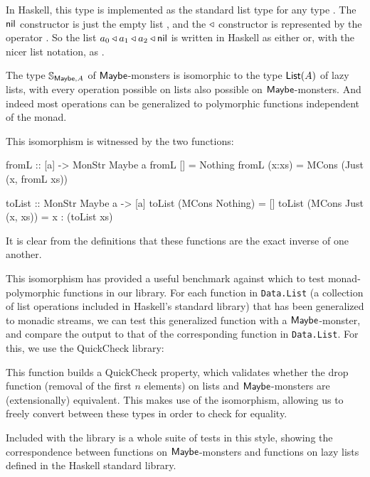 In Haskell, this type is implemented as the standard list type \hcode{[a]} for any type . The $\mathsf{nil}$ constructor is just the empty list \hcode{[]}, and the $\triangleleft$ constructor is represented by the operator \hcode{(:)}.
So the list $a_0\triangleleft a_1\triangleleft a_2\triangleleft \mathsf{nil}$ is written in Haskell as either  or, with the nicer list notation, as \hcode{[a0,a1,a2]}.

The type $\mathbb{S}_{\mathsf{Maybe},A}$ of $\mathsf{Maybe}$-monsters is isomorphic to the type $\mathsf{List}(A)$ of lazy lists, with every operation possible on lists also possible on $\mathsf{Maybe}$-monsters.
And indeed most operations can be generalized to polymorphic functions independent of the monad.

This isomorphism is witnessed by the two functions:
\begin{haskell}
fromL :: [a] -> MonStr Maybe a
fromL [] = Nothing
fromL (x:xs) = MCons (Just (x, fromL xs))

toList :: MonStr Maybe a -> [a]
toList (MCons Nothing) = []
toList (MCons Just (x, xs)) = x : (toList xs)
\end{haskell} 

It is clear from the definitions that these functions are the exact inverse of one another. 

This isomorphism has provided a useful benchmark  against which to test monad-polymorphic functions in our library. For each function in \verb+Data.List+ (a collection of list operations included in Haskell's standard library) that has been generalized to monadic streams, we can test this generalized function with a $\mathsf{Maybe}$-monster, and compare the output to that of the corresponding function in \verb+Data.List+. For this, we use the QuickCheck \cite{quickcheck} library:


This function builds a QuickCheck property, which validates whether the drop function (removal of the first $n$ elements) on lists and $\mathsf{Maybe}$-monsters are (extensionally) equivalent. This makes use of the isomorphism, allowing us to freely convert between these types in order to check for equality.

Included with the library is a whole suite of tests in this style, showing the correspondence between functions on $\mathsf{Maybe}$-monsters and functions on lazy lists defined in the Haskell standard library.

